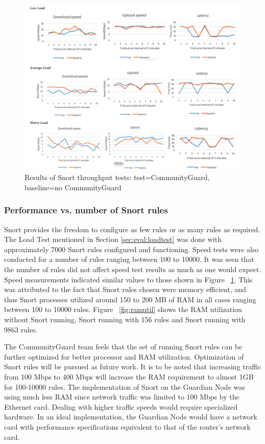 \begin{figure}
	\centering
	\includegraphics[width=0.77\linewidth]{figs/graph.png}
	\caption{Results of Snort throughput tests: test=CommunityGuard, baseline=no CommunityGuard}
	\label{fig:graph}
\end{figure}

\subsubsection{Performance vs. number of Snort rules}
Snort provides the freedom to configure as few rules or as many rules as required. The Load Test mentioned in Section \ref{sec:eval:loadtest} was done with approximately 7000 Snort rules configured and functioning. Speed tests were also conducted for a number of rules ranging between 100 to 10000. It was seen that the number of rules did not affect speed test results as much as one would expect. Speed measurements indicated similar values to those shown in Figure ~\ref{fig:graph}. This was attributed to the fact that Snort rules chosen were memory efficient, and thus Snort processes utilized around 150 to 200 MB of RAM in all cases ranging between 100 to 10000 rules. Figure ~\ref{fig:ramutil} shows the RAM utilization without Snort running, Snort running with 156 rules and Snort running with 9863 rules. 

The CommunityGuard team  feels that the set of running Snort rules can be further optimized for better processor and RAM utilization. Optimization of Snort rules will be pursued as future work. It is to be noted that increasing traffic from 100 Mbps to 400 Mbps will increase the RAM requirement to almost 1GB for 100-10000 rules. The implementation of Snort on the Guardian Node was using much less RAM since network traffic was limited to 100 Mbps by the Ethernet card. Dealing with higher traffic speeds would require specialized hardware. In an ideal implementation, the Guardian Node would have a network card with performance specifications equivalent to that of the router's network card.

